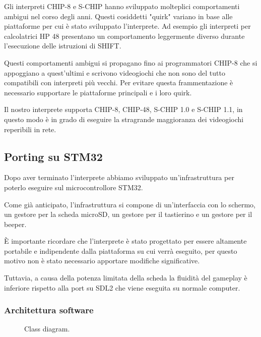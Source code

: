 \documentclass[a4paper]{article}
\begin{document}
Gli interpreti CHIP-8 e S-CHIP hanno sviluppato molteplici
comportamenti ambigui nel corso degli anni. Questi cosiddetti
"quirk" variano in base alle piattaforme per cui è stato sviluppato
l'interprete. Ad esempio gli interpreti per calcolatrici HP 48
presentano un comportamento leggermente diverso durante l'esecuzione
delle istruzioni di SHIFT.

Questi comportamenti ambigui si propagano fino ai programmatori
CHIP-8 che si appoggiano a quest'ultimi e scrivono videogiochi che
non sono del tutto compatibili con interpreti più vecchi. Per evitare
questa frammentazione è necessario supportare le piattaforme
principali e i loro quirk.

Il nostro interprete supporta CHIP-8, CHIP-48, S-CHIP 1.0 e
S-CHIP 1.1, in questo modo è in grado di eseguire la stragrande
maggioranza dei videogiochi reperibili in rete.

\subsection{Porting su STM32}

Dopo aver terminato l'interprete abbiamo sviluppato un'infrastruttura per poterlo eseguire
sul microcontrollore STM32.

Come già anticipato, l'infrastruttura si compone di un'interfaccia con lo schermo,
un gestore per la scheda microSD, un gestore per il tastierino e un gestore per il beeper.

È importante ricordare che l'interprete è stato progettato per essere altamente portabile
e indipendente dalla piattaforma su cui verrà eseguito, per questo motivo non è stato necessario
apportare modifiche significative.

Tuttavia, a causa della potenza limitata della scheda la fluidità del gameplay è inferiore
rispetto alla port su SDL2 che viene eseguita su normale computer.

\subsubsection{Architettura software}

\begin{figure}[h!t]
    \begin{center}
        \begin{tikzpicture}[scale=0.6, transform shape]
            
        \end{tikzpicture}
    \end{center}
    \caption{
       Class diagram.
    }
    \label{fig:class_diagram}
\end{figure}
\end{document}
